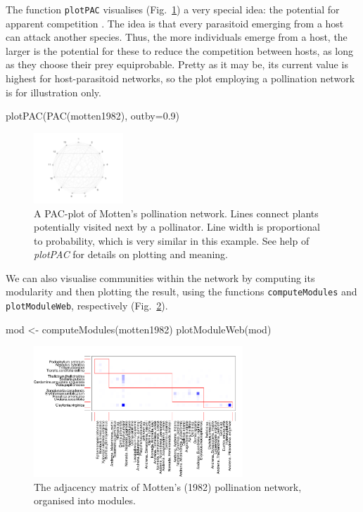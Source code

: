 \documentclass[a4paper, 11pt]{article}\usepackage[]{graphicx}\usepackage[]{color}
\makeatletter
\newcommand{\indR}[1]{\texttt{#1}\index{#1@\texttt{#1}}}   %
\makeatother
\begin{document}
The function \indR{plotPAC} visualises  (Fig.~\ref{fig:AplotPAC}) a very special idea: the potential for apparent competition \citep{Morris2005}. The idea is that every parasitoid emerging from a host can attack another species. Thus, the more individuals emerge from a host, the larger is the potential for these to reduce the competition between hosts, as long as they choose their prey equiprobable. Pretty as it may be, its current value is highest for host-parasitoid networks, so the plot employing a pollination network is for illustration only.
\begin{Schunk}
\begin{Sinput}
plotPAC(PAC(motten1982), outby=0.9)
\end{Sinput}
\end{Schunk}

\begin{figure}
	\includegraphics[width=0.3\textwidth]{figures/motten1982_PACplot}
	\caption{A PAC-plot of Motten's \citeyear{Motten1982} pollination network. Lines connect plants potentially visited next by a pollinator. Line width is proportional to probability, which is very similar in this example. See help of \emph{plotPAC} for details on plotting and meaning.}
	\label{fig:AplotPAC}
\end{figure}
%
We can also visualise communities within the network by computing its modularity and then plotting the result, using the functions \texttt{computeModules} and \texttt{plotModuleWeb}, respectively (Fig.~\ref{fig:Amoduleplot}).
\begin{Schunk}
\begin{Sinput}
mod <- computeModules(motten1982)
plotModuleWeb(mod)
\end{Sinput}
\end{Schunk}
\begin{figure}[h]
\centering
	\includegraphics[width=0.7\textwidth]{figures/motten1982_moduleplot}
	\caption{The adjacency matrix of Motten's (1982) pollination network, organised into modules.}
	\label{fig:Amoduleplot}
\end{figure}
\end{document}
